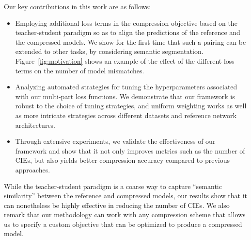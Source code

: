 \noindent Our key contributions in this work are as follows:
\begin{itemize}
    \item Employing additional loss terms in the compression objective based on the teacher-student paradigm so as to align the predictions of the reference and the compressed models. %
    We show for the first time that such a pairing can be extended to other tasks, by considering semantic segmentation. Figure~\ref{fig:motivation} shows an example of the effect of the different loss terms on the number of model mismatches.
    \item Analyzing automated strategies for tuning the hyperparameters associated with our multi-part loss functions. We demonstrate that our framework is robust to the choice of tuning strategies, and uniform weighting works as well as more intricate strategies across different datasets and reference network architectures.
    \item Through extensive experiments, we validate the effectiveness of our framework and show that it not only improves metrics such as the number of CIEs, but also yields better compression accuracy compared to previous approaches. %
\end{itemize}


While the teacher-student paradigm is a coarse way to capture ``semantic similarity'' between the reference and compressed models, our results show that it can nonetheless be highly effective in reducing the number of CIEs.
We also remark that our methodology can work with any compression scheme that allows us to specify a custom objective that can be optimized to produce a compressed model. 